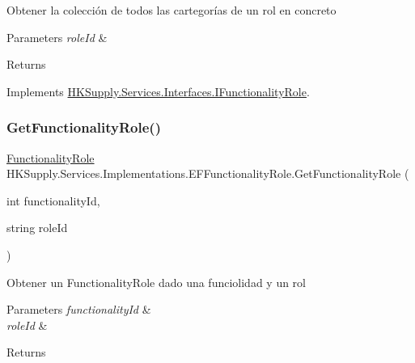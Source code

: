 Obtener la colección de todos las cartegorías de un rol en concreto 


\begin{DoxyParams}{Parameters}
{\em role\+Id} & \\
\hline
\end{DoxyParams}
\begin{DoxyReturn}{Returns}

\end{DoxyReturn}


Implements \mbox{\hyperlink{interface_h_k_supply_1_1_services_1_1_interfaces_1_1_i_functionality_role}{H\+K\+Supply.\+Services.\+Interfaces.\+I\+Functionality\+Role}}.

\mbox{\label{class_h_k_supply_1_1_services_1_1_implementations_1_1_e_f_functionality_role_a1900a194c92ba75d17fe42830190895f}} 
\subsubsection{\texorpdfstring{Get\+Functionality\+Role()}{GetFunctionalityRole()}}
{\footnotesize\ttfamily \mbox{\hyperlink{class_h_k_supply_1_1_models_1_1_functionality_role}{Functionality\+Role}} H\+K\+Supply.\+Services.\+Implementations.\+E\+F\+Functionality\+Role.\+Get\+Functionality\+Role (\begin{DoxyParamCaption}\item[{int}]{functionality\+Id,  }\item[{string}]{role\+Id }\end{DoxyParamCaption})}



Obtener un Functionality\+Role dado una funciolidad y un rol 


\begin{DoxyParams}{Parameters}
{\em functionality\+Id} & \\
\hline
{\em role\+Id} & \\
\hline
\end{DoxyParams}
\begin{DoxyReturn}{Returns}

\end{DoxyReturn}


